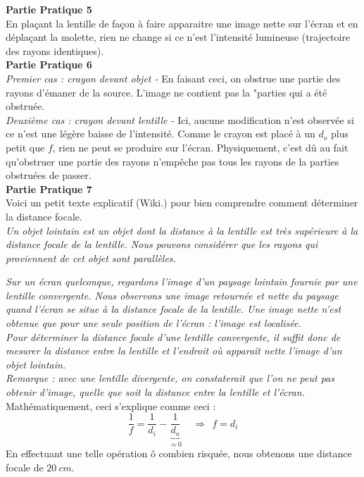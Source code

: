 \documentclass	[11pt, a4paper, openany]{book}
\begin{document}
		\textbf{Partie Pratique 5}\\
		En plaçant la lentille de façon à faire apparaitre une image nette sur l'écran et en déplaçant la molette, rien ne change si ce n'est l'intensité lumineuse (trajectoire des rayons identiques).\\
		
		\textbf{Partie Pratique 6}\\
		\textit{Premier cas : crayon devant objet -} En faisant ceci, on obstrue une partie des rayons d'émaner de la source. L'image ne contient pas la "parties qui a été obstruée.\\
		
		\textit{Deuxième cas : crayon devant lentille -} Ici, aucune modification n'est observée si ce n'est une légère baisse de l'intensité. Comme le crayon est placé à un $d_o$ plus petit que $f$, rien ne peut se produire sur l'écran. Physiquement, c'est dû au fait qu'obstruer une partie des rayons n'empêche pas tous les rayons de la parties obstruées de passer.\\
		
		\textbf{Partie Pratique 7}\\
		Voici un petit texte explicatif (Wiki.) pour bien comprendre comment déterminer la distance focale.\\
		
		\textit{Un objet lointain est un objet dont la distance à la lentille est très supérieure à la distance focale de la lentille. Nous pouvons considérer que les rayons qui proviennent de cet objet sont parallèles.}
		
		\textit{Sur un écran quelconque, regardons l'image d'un paysage lointain fournie par une lentille convergente. Nous observons une image retournée et nette du paysage quand l'écran se situe à la distance focale de la lentille. Une image nette n'est obtenue que pour une seule position de l'écran : l'image est localisée.}\\
		
		\textit{Pour déterminer la distance focale d'une lentille convergente, il suffit donc de mesurer la distance entre la lentille et l'endroit où apparaît nette l'image d'un objet lointain.}\\
		
		\textit{Remarque : avec une lentille divergente, on constaterait que l'on ne peut pas obtenir d'image, quelle que soit la distance entre la lentille et l'écran.}\\
		
		Mathématiquement, ceci s'explique comme ceci :
		\begin{equation}
			\frac{1}{f} = \frac{1}{d_i} - \underbrace{\frac{1}{d_o}}_{\approx 0}\ \ \ \ \ \Rightarrow \ \ f = d_i
		\end{equation}
		En effectuant une telle opération ô combien risquée, nous obtenons une distance focale de $20\ cm$.\\
		
\end{document}
